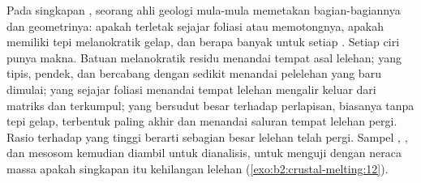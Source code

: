 \begin{inthefield}
Pada singkapan , seorang ahli geologi mula-mula memetakan bagian-bagiannya dan geometrinya: apakah
 terletak sejajar foliasi atau memotongnya, apakah  memiliki tepi melanokratik gelap,
dan berapa banyak  untuk setiap . Setiap ciri punya makna. Batuan
melanokratik residu menandai tempat asal lelehan;  yang tipis, pendek, dan bercabang dengan
sedikit  menandai pelelehan yang baru dimulai;  yang sejajar foliasi
menandai tempat lelehan mengalir keluar dari matriks dan terkumpul;  yang bersudut besar terhadap
perlapisan, biasanya tanpa tepi gelap, terbentuk paling akhir dan menandai saluran tempat
lelehan pergi. Rasio  terhadap  yang tinggi berarti sebagian besar lelehan telah pergi.
Sampel , , dan mesosom kemudian diambil untuk dianalisis, untuk menguji dengan neraca
massa apakah singkapan itu kehilangan lelehan (\cref{exo:b2:crustal-melting:12}).
\end{inthefield}

